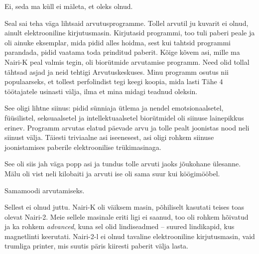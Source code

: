 Ei, seda ma küll ei mäleta, et oleks olnud.


Seal sai teha väga lihtsaid arvutusprogramme. Tollel 
arvutil ju kuvarit ei olnud, ainult elektrooniline kirjutusmasin. 
Kirjutasid programmi, too tuli paberi peale ja oli ainuke eksemplar, mida pidid alles hoidma, sest kui tahtsid programmi parandada, pidid vaatama toda prinditud paberit. Kõige kõvem asi, mille ma 
Nairi-K peal valmis tegin, oli biorütmide arvutamise programm. Need olid tollal 
tähtsad asjad ja neid tehtigi Arvutuskeskuses. Minu programm osutus nii
populaarseks, et tollest 
perfolindist tegi keegi koopia, mida lasti Tähe 4 
töötajatele usinasti välja, ilma et mina midagi teadnud oleksin.


See oligi lihtne siinus: pidid sünniaja ütlema ja nendel emotsionaalsetel, füüsilistel, seksuaalsetel ja intellektuaalsetel biorütmidel oli siinuse 
lainepikkus erinev. Programm arvutas elatud päevade arvu ja tolle pealt 
joonistas nood neli siinust välja. Täiesti 
triviaalne asi iseenesest, asi oligi rohkem siinuse joonistamises paberile elektroonilise trükimasinaga. 


See oli siis jah väga popp asi ja tundus tolle arvuti jaoks 
jõukohane ülesanne. Mälu oli vist neli kilobaiti ja arvuti ise oli sama suur kui köögimööbel.


Samamoodi arvutamiseks.


Sellest ei olnud juttu. Nairi-K oli 
väiksem masin, põhiliselt kasutati teises toas olevat Nairi-2. Meie sellele masinale eriti ligi ei saanud, too 
oli rohkem hõivatud ja ka rohkem \emph{advanced}, kuna sel 
olid lindiseadmed -- suured lindikapid, kus magnetlinti 
keerutati. Nairi-2-l ei olnud tavaline elektrooniline kirjutusmasin, 
vaid trumliga printer, mis suutis päris kiiresti paberit 
välja lasta.

